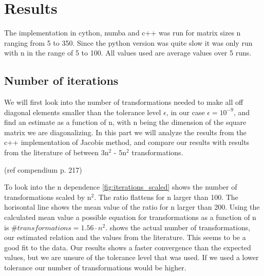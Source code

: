 \section{Results}

The implementation in cython, numba and c++ was run for matrix sizes n ranging from 5
to 350. Since the python version was quite slow it was only run with n in the
range of 5 to 100. All values used are average values over 5 runs.


\subsection{Number of iterations}

We will first look into the number of transformations needed to make all off
diagonal elements smaller than the tolerance level $\epsilon$, in our case
$\epsilon = 10^{-9}$, and find an estimate as a function of n, with n being the
dimension of the square matrix we are diagonalizing. In this part we will
analyze the results from the c++ implementation of Jacobis method, and compare
our results with results from the literature of between 3n$^2$ - 5n$^2$
transformations.

(ref compendium p. 217)

To look into the n dependence \cref{fig:iterations_scaled} shows the number of
transformations scaled by n$^2$. The ratio flattens for n larger than 100. The
horisontal line shows the mean value of the ratio for n larger than 200. Using
the calculated mean value a possible equation for transformations as a function
of n is $\#transformations = 1.56\cdot n^2$.  shows the
actual number of transformations, our estimated relation and the values from the literature.
This seems to be a
good fit to the data. Our results shows a faster convergence than the expected
values, but we are unsure of the tolerance level that was used. If we used a
lower tolerance our number of transformations would be higher.


